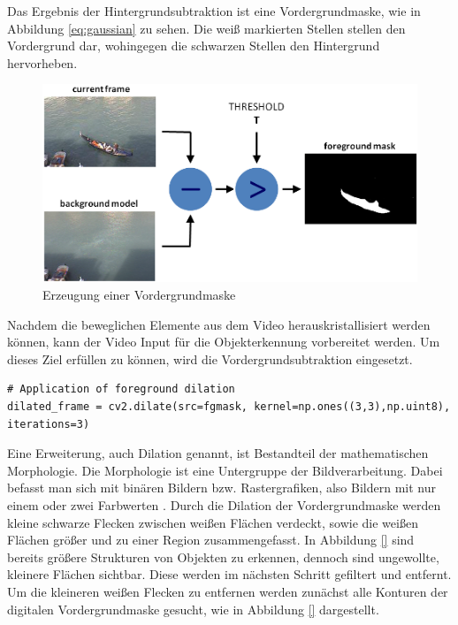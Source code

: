 Das Ergebnis der Hintergrundsubtraktion ist eine Vordergrundmaske, wie in Abbildung \ref{eq:gaussian} zu sehen. Die weiß markierten Stellen stellen den Vordergrund dar, wohingegen die schwarzen Stellen den Hintergrund hervorheben. 


\begin{figure}[htb]
	\centering
	\includegraphics{images/background_subtraction}
	\caption{Erzeugung einer Vordergrundmaske}
	\label{fig:vordergrundmaske}
\end{figure}

Nachdem die beweglichen Elemente aus dem Video herauskristallisiert werden können, kann der Video Input für die Objekterkennung vorbereitet werden. Um dieses Ziel erfüllen zu können, wird die Vordergrundsubtraktion eingesetzt. 

\vspace*{10mm}
\begin{lstlisting}[caption={Dilation der Vordergrundmaske}, label={lst:foreground_dilation}]
# Application of foreground dilation
dilated_frame = cv2.dilate(src=fgmask, kernel=np.ones((3,3),np.uint8), iterations=3)
\end{lstlisting}

Eine Erweiterung, auch Dilation genannt, ist Bestandteil der mathematischen Morphologie. Die Morphologie ist eine Untergruppe der Bildverarbeitung. Dabei befasst man sich mit binären Bildern bzw. Rastergrafiken, also Bildern mit nur einem oder zwei Farbwerten \cite{Soille1998}. %
Durch die Dilation der Vordergrundmaske werden kleine schwarze Flecken zwischen weißen Flächen verdeckt, sowie die weißen Flächen größer und zu einer Region zusammengefasst. In Abbildung \ref{} sind bereits größere Strukturen von Objekten zu erkennen, dennoch sind ungewollte, kleinere Flächen sichtbar. Diese werden im nächsten Schritt gefiltert und entfernt. Um die kleineren weißen Flecken zu entfernen werden zunächst alle Konturen der digitalen Vordergrundmaske gesucht, wie in Abbildung \ref{} dargestellt. 

